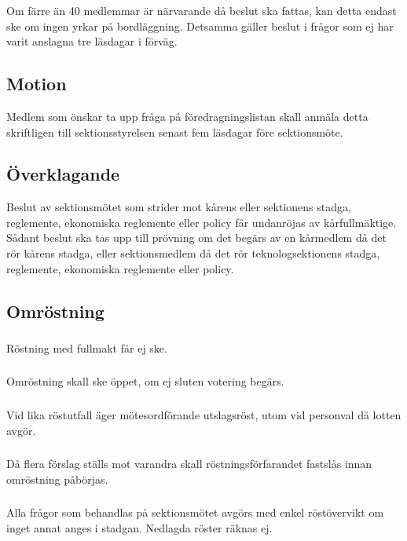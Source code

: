 \documentclass[a4paper, 10pt]{article}
\begin{document}
\subsubsection{}
Om färre än 40 medlemmar är närvarande då beslut ska fattas, kan detta endast ske om ingen yrkar på bordläggning. Detsamma gäller beslut i frågor som ej har varit anslagna tre läsdagar i förväg.
\subsection{Motion}
Medlem som önskar ta upp fråga på föredragningslistan skall anmäla detta skriftligen till sektionsstyrelsen senast fem läsdagar före sektionsmöte.
\subsection{Överklagande}
Beslut av sektionsmötet som strider mot kårens eller sektionens stadga, reglemente, ekonomiska reglemente eller policy får undanröjas av kårfullmäktige. Sådant beslut ska tas upp till prövning om det begärs av en kårmedlem då det rör kårens stadga, eller sektionsmedlem då det rör teknologsektionens stadga, reglemente, ekonomiska reglemente eller policy.
\subsection{Omröstning}
\subsubsection{}
Röstning med fullmakt får ej ske.
\subsubsection{}
Omröstning skall ske öppet, om ej sluten votering begärs.
\subsubsection{}
Vid lika röstutfall äger mötesordförande utslagsröst, utom vid personval då lotten avgör.
\subsubsection{}
Då flera förslag ställs mot varandra skall röstningsförfarandet fastslås innan omröstning påbörjas.
\subsubsection{}
Alla frågor som behandlas på sektionsmötet avgörs med enkel röstövervikt om inget annat anges i stadgan. Nedlagda röster räknas ej.
\end{document}
